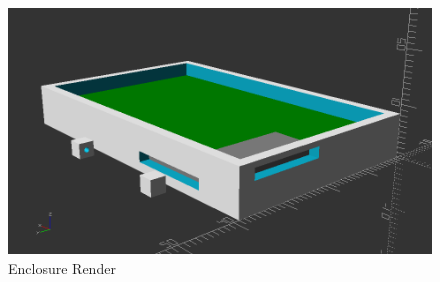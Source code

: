 
\begin{figure}[!htb]
\centering
\includegraphics[width=\textwidth+5cm,height=\textheight,keepaspectratio]{images/enclosure.png}
\caption{Enclosure Render}
\label{fig:enclosure}
\end{figure}
